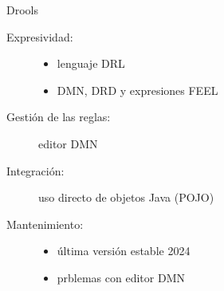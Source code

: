 \documentclass[10pt]{beamer}
\begin{document}
\begin{frame}{Drools}
    \begin{description}
        \item [Expresividad:] 
            \begin{itemize}
                \item lenguaje DRL
                \item DMN, DRD y expresiones FEEL
            \end{itemize}
        \item [Gestión de las reglas:]
            editor DMN
        \item [Integración:] uso directo de objetos Java (POJO)
        \item [Mantenimiento:]
            \begin{itemize}
                \item última versión estable 2024
                \item prblemas con editor DMN
            \end{itemize}
    \end{description}
\end{frame}

\end{document}
